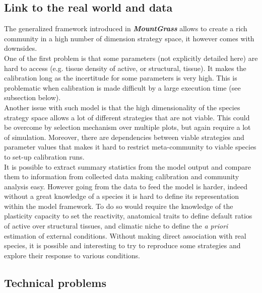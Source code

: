 \documentclass[a4paper,twoside, justified,marginals=raggedright, nobib]{tufte-handout}
\newcommand{\model}{\textit{\textbf{MountGrass }}}
\begin{document}
\subsection{Link to the real world and data}
The generalized framework introduced in \model allows to create a rich community in a high number of dimension strategy space, it however comes with downsides.\\
\indent One of the first problem is that some parameters (not explicitly detailed here) are hard to access (e.g. tissue density of active, or structural, tissue). It makes the calibration long as the incertitude for some parameters is very high. This is problematic when calibration is made difficult by a large execution time (see subsection below).\\
\indent Another issue with such model is that the high dimensionality of the species strategy space allows a lot of different strategies that are not viable. This could be overcome by selection mechanism over multiple plots, but again require a lot of simulation. Moreover, there are dependencies between viable strategies and parameter values that makes it hard to restrict meta-community to viable species to set-up calibration runs.\\
\indent It is possible to extract summary statistics from the model output and compare them to information from collected data making calibration and community analysis easy. However going from the data to feed the model is harder, indeed without a great knowledge of a species it is hard to define its representation within the model framework. To do so would require the knowledge of the plasticity capacity to set the reactivity, anatomical traits to define default ratios of active over structural tissues, and climatic niche to define the \textit{a priori} estimation of external conditions. Without making direct association with real species, it is possible and interesting to try to reproduce some strategies and explore their response to various conditions.

\subsection{Technical problems}
\end{document}
